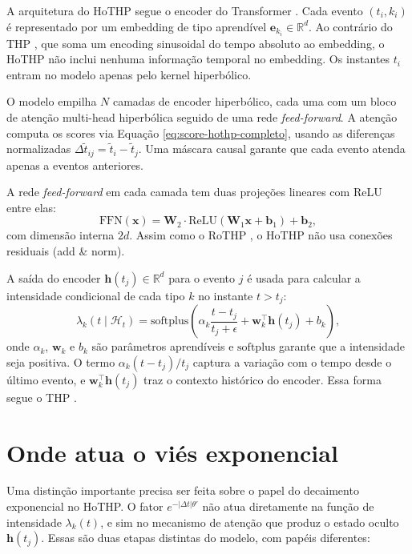 A arquitetura do HoTHP segue o encoder do Transformer \cite{vaswani_attention_2017}. Cada evento $(t_i, k_i)$ é representado por um embedding de tipo aprendível $\mathbf{e}_{k_i} \in \mathbb{R}^d$. Ao contrário do THP \cite{zuo_transformer_2021}, que soma um encoding sinusoidal do tempo absoluto ao embedding, o HoTHP não inclui nenhuma informação temporal no embedding. Os instantes $t_i$ entram no modelo apenas pelo kernel hiperbólico.

O modelo empilha $N$ camadas de encoder hiperbólico, cada uma com um bloco de atenção multi-head hiperbólica seguido de uma rede \textit{feed-forward}. A atenção computa os scores via Equação \ref{eq:score-hothp-completo}, usando as diferenças normalizadas $\Delta\tilde{t}_{ij} = \tilde{t}_i - \tilde{t}_j$. Uma máscara causal garante que cada evento atenda apenas a eventos anteriores.

A rede \textit{feed-forward} em cada camada tem duas projeções lineares com ReLU entre elas:
%
\begin{equation}
    \mathrm{FFN}(\mathbf{x}) = \mathbf{W}_2 \cdot \mathrm{ReLU}(\mathbf{W}_1 \mathbf{x} + \mathbf{b}_1) + \mathbf{b}_2,
\end{equation}
%
com dimensão interna $2d$. Assim como o RoTHP \cite{gao_rothp_2024}, o HoTHP não usa conexões residuais (add \& norm).

A saída do encoder $\mathbf{h}(t_j) \in \mathbb{R}^d$ para o evento $j$ é usada para calcular a intensidade condicional de cada tipo $k$ no instante $t > t_j$:
%
\begin{equation}
    \lambda_k(t \mid \mathcal{H}_t)
    = \mathrm{softplus}\!\left(
        \alpha_k \frac{t - t_j}{t_j + \epsilon}
        + \mathbf{w}_k^\top \mathbf{h}(t_j)
        + b_k
    \right),
    \label{eq:intensidade-hothp}
\end{equation}
%
onde $\alpha_k$, $\mathbf{w}_k$ e $b_k$ são parâmetros aprendíveis e $\mathrm{softplus}$ garante que a intensidade seja positiva. O termo $\alpha_k (t - t_j) / t_j$ captura a variação com o tempo desde o último evento, e $\mathbf{w}_k^\top \mathbf{h}(t_j)$ traz o contexto histórico do encoder. Essa forma segue o THP \cite{zuo_transformer_2021}.

\section{Onde atua o viés exponencial}
\label{sec:onde-atua-vies}

Uma distinção importante precisa ser feita sobre o papel do decaimento exponencial no HoTHP. O fator $e^{-|\Delta t|\theta'}$ não atua diretamente na função de intensidade $\lambda_k(t)$, e sim no mecanismo de atenção que produz o estado oculto $\mathbf{h}(t_j)$. Essas são duas etapas distintas do modelo, com papéis diferentes:


